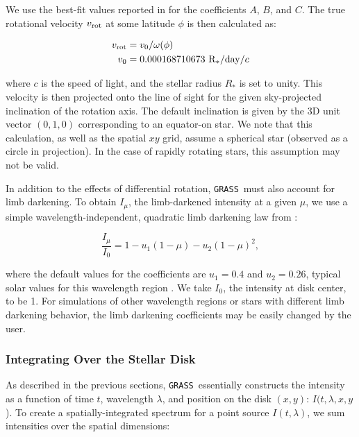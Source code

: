 \documentclass[twocolumn]{aastex63}
\newcommand{\grass}{\texttt{GRASS}}
\begin{document}
\noindent We use the best-fit values reported in \citet{Snodgrass1990} for the coefficients $A$, $B$, and $C$. The true rotational velocity $v_{\rm rot}$ at some latitude $\phi$ is then calculated as:

\begin{align}
    v_{\rm rot} &= v_0 / \omega(\phi) \\
    v_0 &= 0.000168710673\ {\rm R_*/day/}c
\end{align}

\noindent where $c$ is the speed of light, and the stellar radius $R_*$ is set to unity. This velocity is then projected onto the line of sight for the given sky-projected inclination of the rotation axis. The default inclination is given by the 3D unit vector $(0,1,0)$ corresponding to an equator-on star. We note that this calculation, as well as the spatial $xy$ grid, assume a spherical star (observed as a circle in projection). In the case of rapidly rotating stars, this assumption may not be valid. \par 

In addition to the effects of differential rotation, \grass\ must also account for limb darkening. To obtain $I_\mu$, the limb-darkened intensity at a given $\mu$, we use a simple wavelength-independent, quadratic limb darkening law from \citet{Kopal1950}:

\begin{equation}
\frac{I_\mu}{I_0} = 1 - u_1 (1-\mu) - u_2 (1-\mu)^2, 
\end{equation}

\noindent where the default values for the coefficients are $u_1 = 0.4$ and $u_2 = 0.26$, typical solar values for this wavelength region \citep[as verified via][]{Southworth2015}. We take $I_0$, the intensity at disk center, to be 1. For simulations of other wavelength regions or stars with different limb darkening behavior, the limb darkening coefficients may be easily changed by the user. \par 

\subsubsection{Integrating Over the Stellar Disk} \label{sec:disk_int}
As described in the previous sections, \grass\ essentially constructs the intensity as a function of time $t$, wavelength $\lambda$, and position on the disk $(x, y)$: $I(t, \lambda, x, y$).  To create a spatially-integrated spectrum for a point source $I(t, \lambda)$, we sum intensities over the spatial dimensions:
\end{document}
